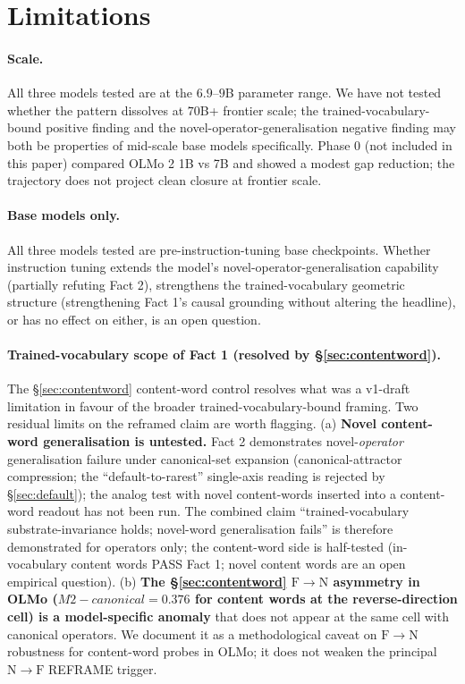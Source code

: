 \documentclass[11pt,letterpaper]{article}
\newcommand{\NtoF}{\ensuremath{\mathrm{N}\!\to\!\mathrm{F}}}
\newcommand{\FtoN}{\ensuremath{\mathrm{F}\!\to\!\mathrm{N}}}
\newcommand{\Mc}{M2-canonical}
\begin{document}
\section{Limitations}
\label{sec:limits}

\paragraph{Scale.} All three models tested are at the $6.9$--$9$B
parameter range. We have not tested whether the pattern dissolves at
$70$B+ frontier scale; the trained-vocabulary-bound positive finding
and the novel-operator-generalisation negative finding may both be
properties of mid-scale base models specifically. Phase 0 (not
included in this paper) compared OLMo 2 1B vs 7B and showed a modest
gap reduction; the trajectory does not project clean closure at
frontier scale.

\paragraph{Base models only.} All three models tested are
pre-instruction-tuning base checkpoints. Whether instruction tuning
extends the model's novel-operator-generalisation capability
(partially refuting Fact 2), strengthens the trained-vocabulary
geometric structure (strengthening Fact 1's causal grounding without
altering the headline), or has no effect on either, is an open
question.

\paragraph{Trained-vocabulary scope of Fact 1 (resolved by
\S\ref{sec:contentword}).} The \S\ref{sec:contentword} content-word
control resolves what was a v1-draft limitation in favour of the
broader trained-vocabulary-bound framing. Two residual limits on the
reframed claim are worth flagging. (a) \textbf{Novel content-word
generalisation is untested.} Fact 2 demonstrates novel-\emph{operator}
generalisation failure under canonical-set expansion
(canonical-attractor compression; the ``default-to-rarest''
single-axis reading is rejected by \S\ref{sec:default}); the analog
test with novel content-words inserted into a content-word readout
has not been run. The combined claim ``trained-vocabulary
substrate-invariance holds; novel-word generalisation fails'' is
therefore demonstrated for operators only; the content-word side is
half-tested (in-vocabulary content words PASS Fact 1; novel content
words are an open empirical question). (b) \textbf{The
\S\ref{sec:contentword} \FtoN{} asymmetry in OLMo ($\Mc = 0.376$ for
content words at the reverse-direction cell) is a model-specific
anomaly} that does not appear at the same cell with canonical
operators. We document it as a methodological caveat on \FtoN{}
robustness for content-word probes in OLMo; it does not weaken the
principal \NtoF{} REFRAME trigger.
\end{document}
